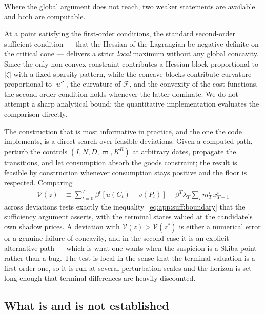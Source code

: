 Where the global argument does not reach, two weaker statements are available and both are computable.

 At a point satisfying the first-order conditions, the standard second-order sufficient condition --- that the Hessian of the Lagrangian be negative definite on the critical cone --- delivers a strict \emph{local} maximum without any global concavity. Since the only non-convex constraint contributes a Hessian block proportional to $\left|\zeta\right|$ with a fixed sparsity pattern, while the concave blocks contribute curvature proportional to $\left|u''\right|$, the curvature of $\mathcal F$, and the convexity of the cost functions, the second-order condition holds whenever the latter dominate. We do not attempt a sharp analytical bound; the quantitative implementation evaluates the comparison directly.

 The construction that is most informative in practice, and the one the code implements, is a direct search over feasible deviations. Given a computed path, perturb the controls $\left(I,N,D,\varpi,K^R\right)$ at arbitrary dates, propagate the transitions, and let consumption absorb the goods constraint; the result is feasible by construction whenever consumption stays positive and the floor is respected. Comparing
\begin{align}
\mathcal V\left(z\right) &\equiv \sum_{t=0}^{T}\beta^t\left[u\left(C_t\right)-v\left(P_t\right)\right]
+\beta^T\lambda_T\sum_i m^i_T\,x^i_{T+1}
\label{eq:app:suff:vtest}
\end{align}
across deviations tests exactly the inequality~\eqref{eq:app:suff:boundary} that the sufficiency argument asserts, with the terminal states valued at the candidate's own shadow prices. A deviation with $\mathcal V\left(z\right)>\mathcal V\left(z^*\right)$ is either a numerical error or a genuine failure of concavity, and in the second case it is an explicit alternative path --- which is what one wants when the suspicion is a Skiba point rather than a bug. The test is local in the sense that the terminal valuation is a first-order one, so it is run at several perturbation scales and the horizon is set long enough that terminal differences are heavily discounted.

\subsection{What is and is not established}\label{sec:app:suff:status}

